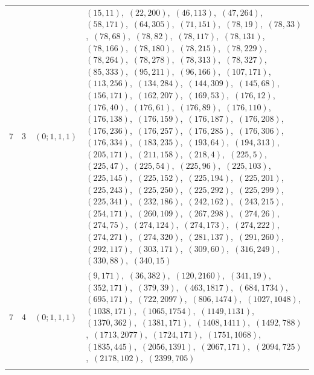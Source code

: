 \documentclass[11pt]{article}
\begin{document}
\begin{longtable}{@{}rrl>{\raggedright\arraybackslash}p{}@{}}
7 & 3 & $(0;1,1,1)$ & $(15,11)$,\allowbreak\ $(22,200)$,\allowbreak\ $(46,113)$,\allowbreak\ $(47,264)$,\allowbreak\ $(58,171)$,\allowbreak\ $(64,305)$,\allowbreak\ $(71,151)$,\allowbreak\ $(78,19)$,\allowbreak\ $(78,33)$,\allowbreak\ $(78,68)$,\allowbreak\ $(78,82)$,\allowbreak\ $(78,117)$,\allowbreak\ $(78,131)$,\allowbreak\ $(78,166)$,\allowbreak\ $(78,180)$,\allowbreak\ $(78,215)$,\allowbreak\ $(78,229)$,\allowbreak\ $(78,264)$,\allowbreak\ $(78,278)$,\allowbreak\ $(78,313)$,\allowbreak\ $(78,327)$,\allowbreak\ $(85,333)$,\allowbreak\ $(95,211)$,\allowbreak\ $(96,166)$,\allowbreak\ $(107,171)$,\allowbreak\ $(113,256)$,\allowbreak\ $(134,284)$,\allowbreak\ $(144,309)$,\allowbreak\ $(145,68)$,\allowbreak\ $(156,171)$,\allowbreak\ $(162,207)$,\allowbreak\ $(169,53)$,\allowbreak\ $(176,12)$,\allowbreak\ $(176,40)$,\allowbreak\ $(176,61)$,\allowbreak\ $(176,89)$,\allowbreak\ $(176,110)$,\allowbreak\ $(176,138)$,\allowbreak\ $(176,159)$,\allowbreak\ $(176,187)$,\allowbreak\ $(176,208)$,\allowbreak\ $(176,236)$,\allowbreak\ $(176,257)$,\allowbreak\ $(176,285)$,\allowbreak\ $(176,306)$,\allowbreak\ $(176,334)$,\allowbreak\ $(183,235)$,\allowbreak\ $(193,64)$,\allowbreak\ $(194,313)$,\allowbreak\ $(205,171)$,\allowbreak\ $(211,158)$,\allowbreak\ $(218,4)$,\allowbreak\ $(225,5)$,\allowbreak\ $(225,47)$,\allowbreak\ $(225,54)$,\allowbreak\ $(225,96)$,\allowbreak\ $(225,103)$,\allowbreak\ $(225,145)$,\allowbreak\ $(225,152)$,\allowbreak\ $(225,194)$,\allowbreak\ $(225,201)$,\allowbreak\ $(225,243)$,\allowbreak\ $(225,250)$,\allowbreak\ $(225,292)$,\allowbreak\ $(225,299)$,\allowbreak\ $(225,341)$,\allowbreak\ $(232,186)$,\allowbreak\ $(242,162)$,\allowbreak\ $(243,215)$,\allowbreak\ $(254,171)$,\allowbreak\ $(260,109)$,\allowbreak\ $(267,298)$,\allowbreak\ $(274,26)$,\allowbreak\ $(274,75)$,\allowbreak\ $(274,124)$,\allowbreak\ $(274,173)$,\allowbreak\ $(274,222)$,\allowbreak\ $(274,271)$,\allowbreak\ $(274,320)$,\allowbreak\ $(281,137)$,\allowbreak\ $(291,260)$,\allowbreak\ $(292,117)$,\allowbreak\ $(303,171)$,\allowbreak\ $(309,60)$,\allowbreak\ $(316,249)$,\allowbreak\ $(330,88)$,\allowbreak\ $(340,15)$\\
7 & 4 & $(0;1,1,1)$ & $(9,171)$,\allowbreak\ $(36,382)$,\allowbreak\ $(120,2160)$,\allowbreak\ $(341,19)$,\allowbreak\ $(352,171)$,\allowbreak\ $(379,39)$,\allowbreak\ $(463,1817)$,\allowbreak\ $(684,1734)$,\allowbreak\ $(695,171)$,\allowbreak\ $(722,2097)$,\allowbreak\ $(806,1474)$,\allowbreak\ $(1027,1048)$,\allowbreak\ $(1038,171)$,\allowbreak\ $(1065,1754)$,\allowbreak\ $(1149,1131)$,\allowbreak\ $(1370,362)$,\allowbreak\ $(1381,171)$,\allowbreak\ $(1408,1411)$,\allowbreak\ $(1492,788)$,\allowbreak\ $(1713,2077)$,\allowbreak\ $(1724,171)$,\allowbreak\ $(1751,1068)$,\allowbreak\ $(1835,445)$,\allowbreak\ $(2056,1391)$,\allowbreak\ $(2067,171)$,\allowbreak\ $(2094,725)$,\allowbreak\ $(2178,102)$,\allowbreak\ $(2399,705)$\\
\addlinespace[3pt]
\end{longtable}
\endgroup
\end{document}
